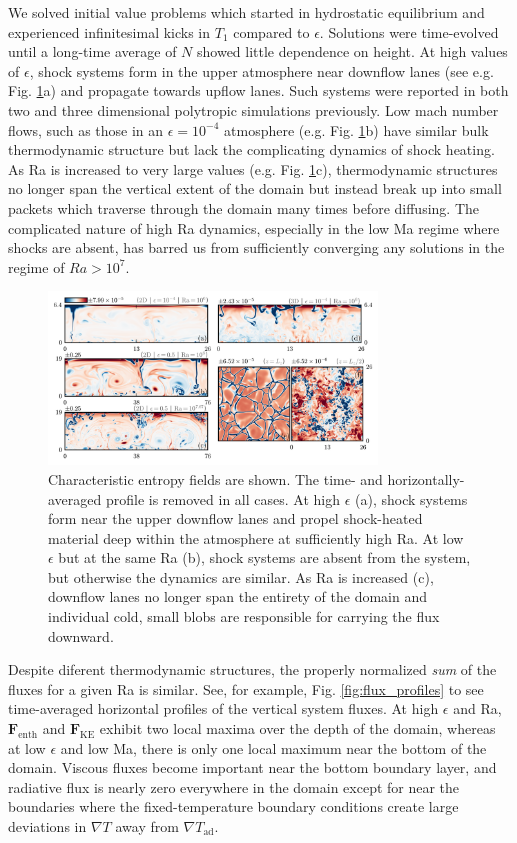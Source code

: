 \documentclass[aps, prl, twocolumn, groupedaddress, amsfonts, amssymb, amsmath]{revtex4-1}
\newcommand{\grad}{\ensuremath{\nabla}}
\begin{document}
We solved initial value problems which started in hydrostatic equilibrium and experienced infinitesimal kicks
in $T_1$ compared to $\epsilon$.  Solutions were time-evolved until a long-time average of $N$ showed little
dependence on height. At
high values of $\epsilon$, shock systems form in the upper atmosphere near downflow lanes 
(see e.g. Fig. \ref{fig:entropy_snapshots}a) and propagate towards upflow lanes.  Such systems were reported in
both two \cite{cattaneo&all1990} and three \cite{malagoli&all1990} dimensional polytropic simulations previously.
Low mach number flows, such as those in an $\epsilon = 10^{-4}$ atmosphere (e.g. Fig. \ref{fig:entropy_snapshots}b)
have similar bulk thermodynamic structure but lack the complicating dynamics of shock heating. As Ra is
increased to very large values (e.g. Fig. \ref{fig:entropy_snapshots}c), thermodynamic structures no longer span
the vertical extent of the domain but instead break up into small packets which traverse through the domain many
times before diffusing.  The complicated nature of high Ra dynamics, especially in the low Ma regime where
shocks are absent, has barred us from sufficiently converging any solutions in the regime of $Ra > 10^7$.

\begin{figure}[t]
\includegraphics[width=3.4375in]{./figs/snapshots_fig.png}
\caption{Characteristic entropy fields are shown. The time- and horizontally-
averaged profile is removed in all cases.  At high
$\epsilon$ (a), shock systems form near the upper downflow lanes and propel shock-heated material deep within
the atmosphere at sufficiently high Ra.  At low $\epsilon$ but at the same Ra (b), shock systems are absent from
the system, but otherwise the dynamics are similar.  As Ra is increased (c), downflow lanes no longer span
the entirety of the domain and individual cold, small blobs are responsible for carrying the flux downward.
\label{fig:entropy_snapshots} }
\end{figure}


Despite diferent thermodynamic structures, the properly normalized \emph{sum} of the fluxes for a given
Ra is similar.  See, for example, Fig. \ref{fig:flux_profiles} to see time-averaged horizontal profiles of
the vertical system fluxes.  At high $\epsilon$ and Ra, $\bm{F}_{\text{enth}}$ and $\bm{F}_{\text{KE}}$
exhibit two local maxima over the depth of the domain, whereas at low $\epsilon$ and low Ma, there is only
one local maximum near the bottom of the domain.  Viscous fluxes become important near the bottom boundary
layer, and radiative flux is nearly zero everywhere in the domain except for near the boundaries where the
fixed-temperature boundary conditions create large deviations in $\grad T$ away from $\grad T_{\text{ad}}$.
\end{document}
